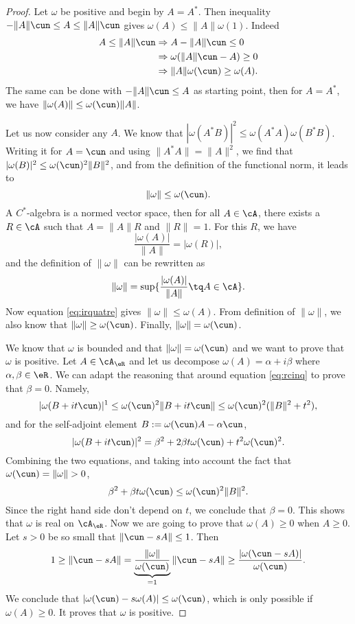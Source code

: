 \begin{proof}
Let $\omega$ be positive and begin by $A=A^*$. Then inequality $-\| A \|\cun\leq A\leq\| A \|\cun$ gives $\omega(A)\leq\| A \|\omega(1)$. Indeed
\begin{equation}
\begin{split}
  A\leq\| A \|\cun&\Rightarrow A-\| A \|\cun\leq 0\\
                  &\Rightarrow\omega(\| A \|\cun-A)\geq0\\
                  &\Rightarrow \| A \|\omega(\cun)\geq\omega(A).
\end{split}
\end{equation}
The same can be done with $-\| A \|\cun\leq A$ as starting point, then for $A=A^*$, we have $\| \omega(A) \|\leq \omega(\cun)\| A \|$.

Let us now consider any $A$. We know that $| \omega(A^*B) |^2\leq\omega(A^*A)\omega(B^*B)$. Writing it for $A=\cun $ and using $\| A^*A \|=\| A \|^2$, we find that $| \omega(B) |^2\leq\omega(\cun)^2\| B \|^2$,
and from the definition of the functional norm, it leads to 
\begin{equation} \label{eq:irquatre}
\| \omega \|\leq\omega(\cun).
\end{equation}
A $C^*$-algebra is a normed vector space, then for all $A\in\cA$, there exists a $R\in\cA$ such that $A=\| A \|R$ and $\| R \|=1$. For this $R$, we have
\[ 
  \frac{| \omega(A) |}{\| A \|}=| \omega(R) |,
\]
and the definition of $\| \omega \|$ can be rewritten as
\[ 
  \| \omega \|=\sup\{ \frac{| \omega(A) |}{\| A \|}\tq A\in\cA \}.
\]
Now equation \eqref{eq:irquatre} gives $\| \omega \|\leq\omega(A)$. From definition of $\| \omega \|$, we also know that $\| \omega \|\geq \omega(\cun)$. Finally, $\| \omega \|=\omega(\cun)$.


We know that $\omega$ is bounded and that $\| \omega \|=\omega(\cun)$ and we want to prove that $\omega$ is positive. Let $A\in\cA_{\eR}$ and let us decompose $\omega(A)=\alpha+i\beta$ where $\alpha,\beta\in\eR$. We can adapt the reasoning that around equation \eqref{eq:rcinq} to prove that $\beta=0$. Namely,
\begin{equation}
  | \omega(B+it\cun) |^1\leq \omega(\cun)^2\| B+it\cun \|
                        \leq \omega(\cun)^2(\| B \|^2+t^2),
\end{equation}
and for the self-adjoint element $B:=\omega(\cun)A-\alpha\cun$,
\[ 
  | \omega(B+it\cun) |^2=\beta^2+2\beta t\omega(\cun)+t^2\omega(\cun)^2.
\]
Combining the two equations, and taking into account the fact that $\omega(\cun)=\| \omega \|>0$,
\[ 
  \beta^2+\beta t\omega(\cun)\leq\omega(\cun)^2\| B \|^2.
\]
Since the right hand side don't depend on $t$, we conclude that $\beta=0$. This shows that $\omega$ is real on $\cA_{\eR}$. Now we are going to prove that $\omega(A)\geq 0$ when $A\geq 0$. Let $s>0$ be so small that $\| \cun-sA \|\leq 1$. Then
\[ 
  1\geq\| \cun-sA \|=\underbrace{\frac{\| \omega \|}{\omega(\cun)}}_{=1}\| \cun-sA \|\geq \frac{| \omega(\cun-sA) |}{\omega(\cun)}.
\]
We conclude that $| \omega(\cun)-s\omega(A) |\leq\omega(\cun)$, which is only possible if $\omega(A)\geq 0$. It proves that $\omega$ is positive.


\end{proof}
